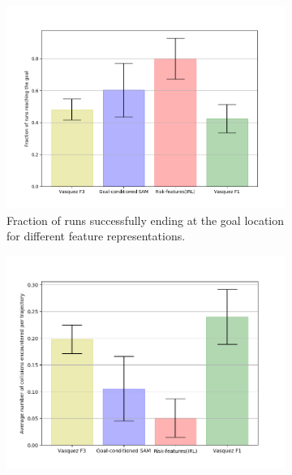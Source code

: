 \begin{figure}[htbp]
	\begin{subfigure}[t]{.5\columnwidth}
	\centering
	\includegraphics[width=\columnwidth]{plots/plot_without_outliers/zara02_inter_irl_no_outlier/goal_reached_zara02_no_outlier_inter_irl.png}
	\caption{Fraction of runs successfully ending at the goal location for different feature representations.}
	\label{fig:inter_method-goal_reached-zara02}
	\end{subfigure}%
	\begin{subfigure}[t]{.5\columnwidth}
		\centering
		\includegraphics[width=\columnwidth]{plots/plot_without_outliers/zara02_inter_irl_no_outlier/count_collisions_zara02_no_outlier_inter_irl.png}
		\label{fig:inter_method-count_collisions-zara02}
	\end{subfigure}%
	\label{fig:inter_method-classic_navigation_metrics-zara02}
\end{figure}

